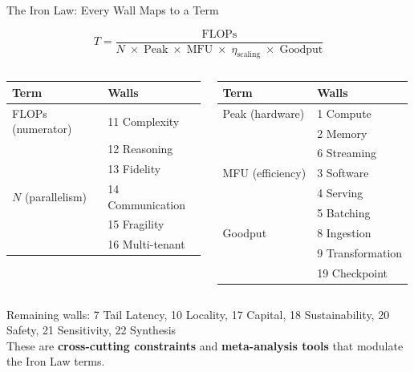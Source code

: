 \begin{frame}{The Iron Law: Every Wall Maps to a Term}
\begin{center}
\large
\[
T = \frac{\text{FLOPs}}{N \;\times\; \text{Peak} \;\times\; \text{MFU} \;\times\; \eta_{\text{scaling}} \;\times\; \text{Goodput}}
\]
\end{center}

\vspace{0.3em}
\small
\begin{columns}[T]
\begin{tabular}{@{}ll@{}}
\toprule
\textbf{Term} & \textbf{Walls} \\
\midrule
FLOPs (numerator) & 11 Complexity \\
                   & 12 Reasoning \\
                   & 13 Fidelity \\
\midrule
$N$ (parallelism)  & 14 Communication \\
                   & 15 Fragility \\
                   & 16 Multi-tenant \\
\bottomrule
\end{tabular}

\begin{tabular}{@{}ll@{}}
\toprule
\textbf{Term} & \textbf{Walls} \\
\midrule
Peak (hardware) & 1 Compute \\
                & 2 Memory \\
                & 6 Streaming \\
\midrule
MFU (efficiency) & 3 Software \\
                 & 4 Serving \\
                 & 5 Batching \\
\midrule
Goodput          & 8 Ingestion \\
                 & 9 Transformation \\
                 & 19 Checkpoint \\
\bottomrule
\end{tabular}
\end{columns}

\vspace{0.5em}
\centering
\footnotesize
Remaining walls: 7 Tail Latency, 10 Locality, 17 Capital, 18 Sustainability, 20 Safety, 21 Sensitivity, 22 Synthesis\\
These are \textbf{cross-cutting constraints} and \textbf{meta-analysis tools} that modulate the Iron Law terms.
\end{frame}

